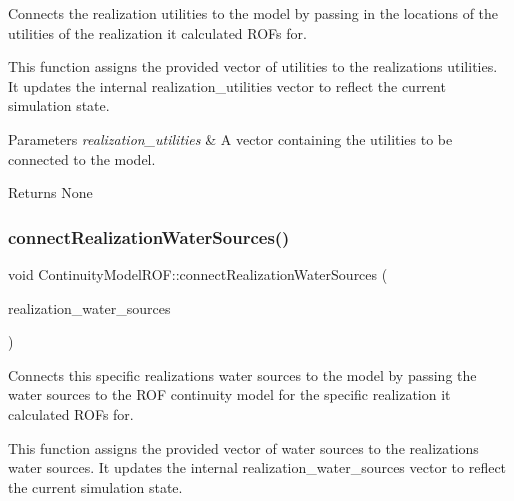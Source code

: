 Connects the realization utilities to the model by passing in the locations of the utilities of the realization it calculated R\+O\+Fs for. 

This function assigns the provided vector of utilities to the realization\textquotesingle{}s utilities. It updates the internal {\ttfamily realization\+\_\+utilities} vector to reflect the current simulation state.


\begin{DoxyParams}{Parameters}
{\em realization\+\_\+utilities} & A vector containing the utilities to be connected to the model.\\
\hline
\end{DoxyParams}
\begin{DoxyReturn}{Returns}
None 
\end{DoxyReturn}
\mbox{\label{classContinuityModelROF_a0c12b5dad97c3783361baad7e53a2634}} 
\subsubsection{\texorpdfstring{connect\+Realization\+Water\+Sources()}{connectRealizationWaterSources()}}
{\footnotesize\ttfamily void Continuity\+Model\+R\+O\+F\+::connect\+Realization\+Water\+Sources (\begin{DoxyParamCaption}\item[{const vector$<$ \mbox{\hyperlink{classWaterSource}{Water\+Source}} $\ast$$>$ \&}]{realization\+\_\+water\+\_\+sources }\end{DoxyParamCaption})}



Connects this specific realization\textquotesingle{}s water sources to the model by passing the water sources to the R\+OF continuity model for the specific realization it calculated R\+O\+Fs for. 

This function assigns the provided vector of water sources to the realization\textquotesingle{}s water sources. It updates the internal {\ttfamily realization\+\_\+water\+\_\+sources} vector to reflect the current simulation state.


